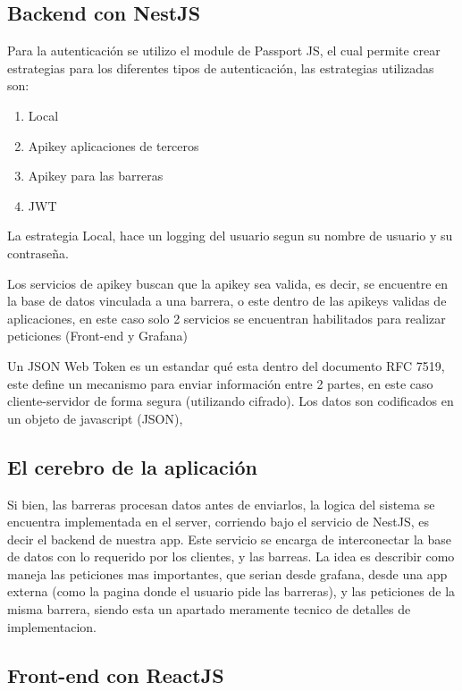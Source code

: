 \subsection{Backend con NestJS}


Para la autenticación se utilizo el module de Passport JS, el cual permite crear estrategias para los diferentes tipos de autenticación, las estrategias utilizadas son:

\begin{enumerate}
    \item Local
    \item Apikey aplicaciones de terceros
    \item Apikey para las barreras
    \item JWT
\end{enumerate}

La estrategia Local, hace un logging del usuario segun su nombre de usuario y su contraseña.

Los servicios de apikey buscan que la apikey sea valida, es decir, se encuentre en la base de datos vinculada a una barrera, o este dentro de las apikeys validas de aplicaciones, en este caso solo 2 servicios se encuentran habilitados para realizar peticiones (Front-end y Grafana)

Un JSON Web Token es un estandar qué esta dentro del documento RFC 7519, este define un mecanismo para enviar información entre 2 partes, en este caso cliente-servidor de forma segura (utilizando cifrado). Los datos son codificados en un objeto de javascript (JSON),

\subsection{El cerebro de la aplicación}

Si bien, las barreras procesan datos antes de enviarlos, la logica del sistema se encuentra implementada en el server, corriendo bajo el servicio de NestJS, es decir el backend de nuestra app. Este servicio se encarga de interconectar la base de datos con lo requerido por los clientes, y las barreas. La idea es describir como maneja las peticiones mas importantes, que serian desde grafana, desde una app externa (como la pagina donde el usuario pide las barreras), y las peticiones de la misma barrera, siendo esta un apartado meramente tecnico de detalles de implementacion.


\subsection{Front-end con ReactJS}

